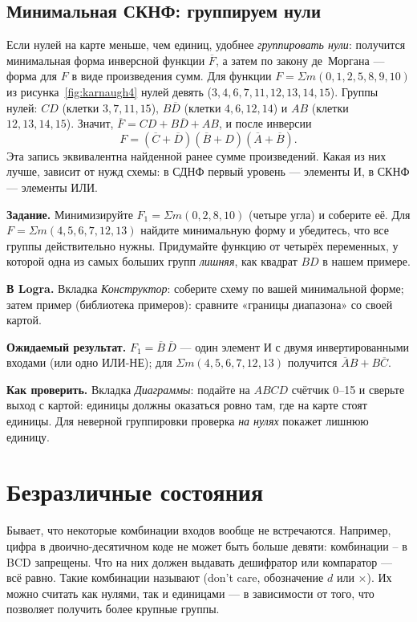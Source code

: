 \subsection{Минимальная СКНФ: группируем нули}

Если нулей на карте меньше, чем единиц, удобнее \emph{группировать
нули}: получится минимальная форма инверсной функции $\overline{F}$, а затем
по закону де~Моргана --- форма для $F$ в виде произведения сумм. Для функции
$F=\Sigma m(0,1,2,5,8,9,10)$ из рисунка~\ref{fig:karnaugh4} нулей девять
($3,4,6,7,11,12,13,14,15$). Группы нулей: $CD$ (клетки $3,7,11,15$), $B\overline{D}$
(клетки $4,6,12,14$) и $AB$ (клетки $12,13,14,15$). Значит,
$\overline{F}=CD+B\overline{D}+AB$, и после инверсии
\[
  F=(\overline{C}+\overline{D})(\overline{B}+D)(\overline{A}+\overline{B}).
\]
Эта запись эквивалентна найденной ранее сумме произведений. Какая из них
лучше, зависит от нужд схемы: в СДНФ первый уровень --- элементы И, в СКНФ ---
элементы ИЛИ.

\begin{diybox}
\textbf{Задание.}  Минимизируйте $F_1=\Sigma m(0,2,8,10)$ (четыре
угла) и соберите её.  Для $F=\Sigma m(4,5,6,7,12,13)$ найдите
минимальную форму и убедитесь, что все группы действительно нужны.
 Придумайте функцию от четырёх переменных, у которой одна
из самых больших групп \emph{лишняя}, как квадрат $BD$ в нашем примере.

\textbf{В Logra.} Вкладка \emph{Конструктор}: соберите схему по
вашей минимальной форме; затем пример  (библиотека
примеров): сравните «границы диапазона» со своей картой.

\textbf{Ожидаемый результат.} $F_1=\overline{B}\,\overline{D}$ --- один
элемент И с двумя инвертированными входами (или одно ИЛИ-НЕ); для
$\Sigma m(4,5,6,7,12,13)$ получится $\overline{A}B+B\overline{C}$.

\textbf{Как проверить.} Вкладка \emph{Диаграммы}: подайте на $ABCD$
счётчик 0--15 и сверьте выход с картой: единицы должны оказаться
ровно там, где на карте стоят единицы. Для неверной группировки
проверка \emph{на нулях} покажет лишнюю единицу.
\end{diybox}

\section{Безразличные состояния}

Бывает, что некоторые комбинации входов вообще не встречаются. Например,
цифра в двоично-десятичном коде не может быть больше девяти: комбинации
-- в BCD запрещены. Что на них должен выдавать
дешифратор или компаратор --- всё равно. Такие комбинации называют
 (don't care, обозначение $d$ или $\times$).
Их можно считать как нулями, так и единицами --- в зависимости от того, что
позволяет получить более крупные группы.

